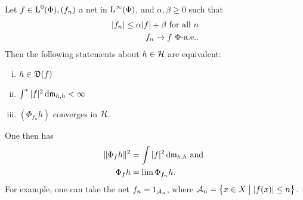 \begin{lem}
  \label{maintheorem2}
Let $f \in {\text{L}^0}(\Phi), (f_n)$ a net in ${\text{L}^\infty}(\Phi)$, and 
$\alpha, \beta \geq 0$ such that
 \begin{align*}
   | f_n | \leq \alpha |f| + \beta \text{ for all } n \\
   f_n \to f ~\Phi\text{-a.e.}.
 \end{align*}
Then the following statements about $h \in \mathcal{H}$ are equivalent:
\begin{enumerate}[(i)]
 \item $h \in \mathfrak{D}(f)$
 \item $\int ^{*} | f| ^2 \operatorname{d}\! \mathfrak{m}_{h,h} < \infty$
 \item $(\Phi_{f_n}h)$ converges in $ \mathcal{H}$.
\end{enumerate}
One then has
\begin{align*}
  \| \Phi_f h \| ^2 &= \int |f|^2 \operatorname{d}\! \mathfrak{m}_{h, h } \text{ and }\\
  \Phi_{f }h &= \lim \Phi_{f_n} h.
\end{align*}
For example, one can take the net $f_n = 1_{\mathcal{A}_n}$, where $\mathcal{A}_n = 
\left\lbrace x \in X \bigm | | f(x) | \leq n \right\rbrace$.
\end{lem}





